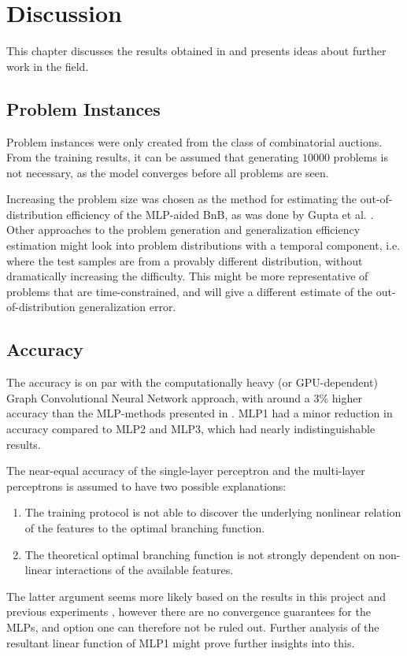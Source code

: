 \chapter{Discussion}\label{cha:discussion}

This chapter discusses the results obtained in  and presents ideas about further work in the field.


\section{Problem Instances}

Problem instances were only created from the class of combinatorial auctions. From the training results, it can be assumed that generating $10000$ problems is not necessary, as the model converges before all problems are seen.  

Increasing the problem size was chosen as the method for estimating the out-of-distribution efficiency of the \gls{MLP}-aided \gls{BnB}, as was done by Gupta et al. \cite{gupta2020hybrid}. Other approaches to the problem generation and generalization efficiency estimation might look into problem distributions with a temporal component, i.e. where the test samples are from a provably different distribution, without dramatically increasing the difficulty. This might be more representative of problems that are time-constrained, and will give a different estimate of the out-of-distribution generalization error.  


\section{Accuracy}

The accuracy is on par with the computationally heavy (or \gls{GPU}-dependent) Graph Convolutional Neural Network approach, with around a $3 \%$ higher accuracy than the \gls{MLP}-methods presented in . MLP1 had a minor reduction in accuracy compared to MLP2 and MLP3, which had nearly indistinguishable results.   

The near-equal accuracy of the single-layer perceptron and the multi-layer perceptrons is assumed to have two possible explanations: 
\begin{enumerate}[label=(\roman*)]
    \item The training protocol is not able to discover the underlying nonlinear relation of the features to the optimal branching function. 
    \item The theoretical optimal branching function is not strongly dependent on non-linear interactions of the available features.
\end{enumerate}
The latter argument seems more likely based on the results in this project and previous experiments \cite{gupta2020hybrid} \cite{gasse2019exact}, however there are no convergence guarantees for the MLPs, and option one can therefore not be ruled out. Further analysis of the resultant linear function of MLP1 might prove further insights into this.

